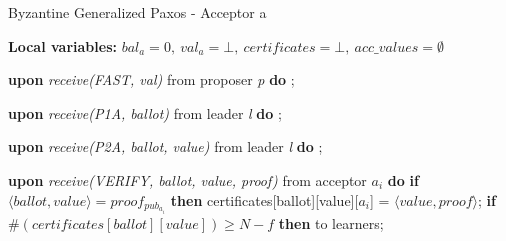 \begin{algorithm}
\begin{algorithmic}[1]
		\iffalse \State
		\Function{proved\_safe}{Q, m}
		\State $k = max(i\ |\ (i < m) \wedge (\exists a \in Q :\ val_a[i]\ \neq null))$;
		\State $RS = \{R \in k$-$quorum\ |\ \forall a \in R \cap Q : val_a[k] \neq null\}$;
		\State $\gamma(R) = \sqcap \{v_a[k]\ |\ a \in Q \cap R \}$;
		\State $\Gamma = \{\gamma(R)\ |\ R \in RS \}$;
		\State
		\If{$RS = \varnothing$}
		\State \textbf{return} $\{val_a[k]\ |\ (a \in Q) \wedge (val_a[k] \neq null)\}$;
		\Else
		\State \textbf{return} $\sqcup \Gamma$;
		\EndIf
		\EndFunction
		\fi
		
	\end{algorithmic}
\end{algorithm}

\begin{algorithm} 
	\caption{Byzantine Generalized Paxos - Acceptor a}
	\label{BFT-Acc}
	\textbf{Local variables: } $bal_a = 0,\ val_a = \bot,\ certificates = \bot,\ acc\_values = \emptyset$ 
	\begin{algorithmic}[1]
		
		\State \textbf{upon} \textit{receive(FAST, val)} from proposer \textit{p} \textbf{do}
		\State \hspace{\algorithmicindent} ;
		
		\State
		\State \textbf{upon} \textit{receive(P1A, ballot)} from leader \textit{l} \textbf{do}
		\State \hspace{\algorithmicindent} ;
		
		\State
		\State \textbf{upon} \textit{receive(P2A, ballot, value)} from leader \textit{l} \textbf{do}
		\State \hspace{\algorithmicindent} ; 
		
		\State 
		\State \textbf{upon} \textit{receive(VERIFY, ballot, value, proof)} from acceptor $a_i$ \textbf{do}
		\State \hspace{\algorithmicindent} \textbf{if} $\langle ballot, value \rangle = proof_{pub_{a_i}}$   \textbf{then}
		\State \hspace{\algorithmicindent}\hspace{\algorithmicindent} certificates[ballot][value][$a_i$] = $\langle value, proof \rangle$;
		\State
		\State \hspace{\algorithmicindent} \textbf{if} $\#(certificates[ballot][value]) \geq N-f$ \textbf{then}
		\State \hspace{\algorithmicindent}\hspace{\algorithmicindent}  to learners;
			

\end{algorithmic}
\end{algorithm}
